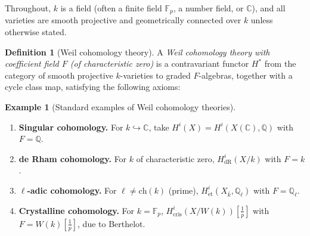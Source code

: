 \documentclass[12pt,a4paper]{amsart}
\theoremstyle{definition}
\newtheorem{definition}[theorem]{Definition}
\newtheorem{example}[theorem]{Example}
\newcommand{\Q}{\mathbb{Q}}
\newcommand{\C}{\mathbb{C}}
\newcommand{\Fp}{\mathbb{F}_p}
\newcommand{\ch}{\mathrm{ch}}
\newcommand{\CH}{\mathrm{CH}}
\newcommand{\cl}{\mathrm{cl}}
\begin{document}
Throughout, $k$ is a field (often a finite field $\Fp$, a number field, or
$\C$), and all varieties are smooth projective and geometrically connected
over $k$ unless otherwise stated.

\begin{definition}[Weil cohomology theory]
A \emph{Weil cohomology theory with coefficient field $F$ (of characteristic
zero)} is a contravariant functor $H^*$ from the category of smooth projective
$k$-varieties to graded $F$-algebras, together with a cycle class map,
satisfying the following axioms:
\end{definition}

\begin{example}[Standard examples of Weil cohomology theories]
\begin{enumerate}[label=(\alph*)]
  \item \textbf{Singular cohomology.}  For $k \hookrightarrow \C$, take
        $H^i(X) = H^i(X(\C),\Q)$ with $F = \Q$.
  \item \textbf{de Rham cohomology.}  For $k$ of characteristic zero,
        $H^i_{\mathrm{dR}}(X/k)$ with $F = k$.
  \item \textbf{$\ell$-adic cohomology.}  For $\ell \neq \ch(k)$ (prime),
        $H^i_{\mathrm{\acute{e}t}}(X_{\bar k}, \Q_\ell)$ with $F = \Q_\ell$.
  \item \textbf{Crystalline cohomology.}  For $k = \Fp$,
        $H^i_{\mathrm{cris}}(X/W(k))[\frac{1}{p}]$ with $F = W(k)[\frac{1}{p}]$,
        due to Berthelot.
\end{enumerate}
\end{example}
\end{document}
